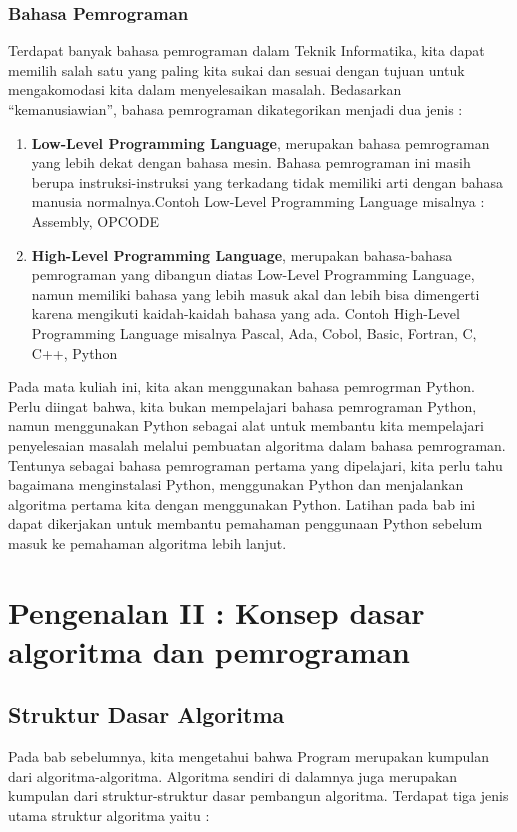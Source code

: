 \subsection{Bahasa Pemrograman}
Terdapat banyak bahasa pemrograman dalam Teknik Informatika, kita dapat memilih salah satu yang paling kita sukai dan sesuai dengan tujuan untuk mengakomodasi kita dalam menyelesaikan masalah. Bedasarkan “kemanusiawian”, bahasa pemrograman dikategorikan menjadi dua jenis : 
\begin{enumerate}
	\item \textbf{Low-Level Programming Language}, merupakan bahasa pemrograman yang lebih dekat dengan bahasa mesin. Bahasa pemrograman ini masih berupa instruksi-instruksi yang terkadang tidak memiliki arti dengan bahasa manusia normalnya.Contoh Low-Level Programming Language misalnya : Assembly, OPCODE
	\item \textbf{High-Level Programming Language}, merupakan bahasa-bahasa pemrograman yang dibangun diatas Low-Level Programming Language, namun memiliki bahasa yang lebih masuk akal dan lebih bisa dimengerti karena mengikuti kaidah-kaidah bahasa yang ada. Contoh High-Level Programming Language misalnya	Pascal, Ada, Cobol, Basic, Fortran, C, C++, Python
	\end{enumerate}

Pada mata kuliah ini, kita akan menggunakan bahasa pemrogrman Python. Perlu diingat bahwa, kita bukan mempelajari bahasa pemrograman Python, namun menggunakan Python sebagai alat untuk membantu kita mempelajari penyelesaian masalah melalui pembuatan algoritma dalam bahasa pemrograman.
Tentunya sebagai bahasa pemrograman pertama yang dipelajari, kita perlu tahu bagaimana menginstalasi Python, menggunakan Python dan menjalankan algoritma pertama kita dengan menggunakan Python. Latihan pada bab ini dapat dikerjakan untuk membantu pemahaman penggunaan Python sebelum masuk ke pemahaman algoritma lebih lanjut. 

\chapter{Pengenalan II : Konsep dasar algoritma dan pemrograman}\label{ch:pengantarAlgoritma}


\section{Struktur Dasar Algoritma}
Pada bab sebelumnya, kita mengetahui bahwa Program merupakan kumpulan dari algoritma-algoritma. Algoritma sendiri di dalamnya juga merupakan kumpulan dari struktur-struktur dasar pembangun algoritma. Terdapat tiga jenis utama struktur algoritma yaitu : 


